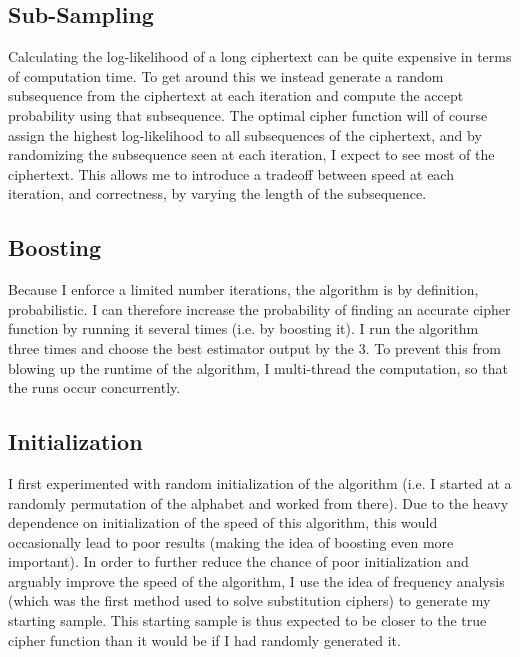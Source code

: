 \documentclass[secnumaric,notitlepage,amsmath,amssymb,nofootinbib,floatfix,12pt]{revtex4-1}
\begin{document}
\subsection*{Sub-Sampling}
Calculating the log-likelihood of a long ciphertext can be quite expensive in terms of computation time. To get around this we instead generate a random subsequence from the ciphertext at each iteration and compute the accept probability using that subsequence. The optimal cipher function will of course assign the highest log-likelihood to all subsequences of the ciphertext, and by randomizing the subsequence seen at each iteration, I expect to see most of the ciphertext. This allows me to introduce a tradeoff between speed at each iteration, and correctness, by varying the length of the subsequence.

\subsection*{Boosting}
Because I enforce a limited number iterations, the algorithm is by definition, probabilistic. I can therefore increase the probability of finding an accurate cipher function by running it several times (i.e. by boosting it). I run the algorithm three times and choose the best estimator output by the 3. To prevent this from blowing up the runtime of the algorithm, I multi-thread the computation, so that the runs occur concurrently.

\subsection*{Initialization}
I first experimented with random initialization of the algorithm (i.e. I started at a randomly permutation of the alphabet and worked from there). Due to the heavy dependence on initialization of the speed of this algorithm, this would occasionally lead to poor results (making the idea of boosting even more important). In order to further reduce the chance of poor initialization and arguably improve the speed of the algorithm, I use the idea of frequency analysis (which was the first method used to solve substitution ciphers) to generate my starting sample. This starting sample is thus expected to be closer to the true cipher function than it would be if I had randomly generated it.

\end{document}

